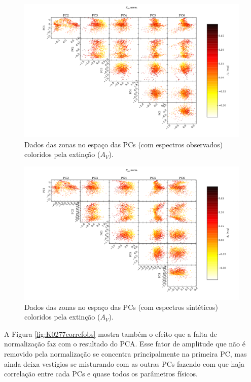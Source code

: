 \begin{figure}
	\includegraphics[width=1.4\textwidth, angle=-90]{figuras/K0277-f_obs_norm-corre_PCxPC_AV.pdf}
	\caption[Dados no espaço das PCs vs AV- $F_{obs}$ norm.]
    {Dados das zonas no espaço das PCs (com espectros observados) coloridos pela extinção ($A_V$).}
    \label{fig:K0277correfobsnormPCvsPC:AV}	
\end{figure}

\begin{figure}
	\includegraphics[width=1.4\textwidth, angle=-90]{figuras/K0277-f_syn_norm-corre_PCxPC_AV.pdf}
	\caption[Dados no espaço das PCs vs AV- $F_{syn}$ norm.]
    {Dados das zonas no espaço das PCs (com espectros sintéticos) coloridos pela extinção ($A_V$).}
    \label{fig:K0277correfsynnormPCvsPC:AV}	
\end{figure}

A Figura \ref{fig:K0277correfobs} mostra também o efeito que a falta de normalização faz com o resultado do PCA.
Esse fator de amplitude que não é removido pela normalização se concentra principalmente na primeira PC, mas ainda
deixa vestígios se misturando com as outras PCs fazendo com que haja correlação entre cada PCs e quase todos os
parâmetros físicos.

